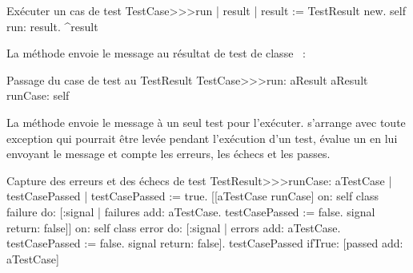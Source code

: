 \documentclass[a4paper,10pt,twoside]{book}
\begin{document}
\begin{method}[tastecaserun]{Exécuter un cas de test}
TestCase>>>run
	| result |
	result := TestResult new.
	self run: result.
	^result
\end{method}


La méthode  envoie le message  au résultat de test de classe ~:

\begin{method}[testcaserun:]{Passage du case de test au TestResult}
TestCase>>>run: aResult
	aResult runCase: self
\end{method}
La méthode  envoie le message  à un seul test pour l'exécuter.
 s'arrange avec toute exception qui pourrait être levée pendant l'exécution d'un test, évalue un  en lui envoyant le message  et compte les erreurs, les échecs et les passes.
\begin{method}[testresultruncase]{Capture des erreurs et des échecs de test}
TestResult>>>runCase: aTestCase
	| testCasePassed |
	testCasePassed := true.
	[[aTestCase runCase] 
			on: self class failure
			do: 
				[:signal | 
				failures add: aTestCase.
				testCasePassed := false.
				signal return: false]]
					on: self class error
					do:
						[:signal |
						errors add: aTestCase.
						testCasePassed := false.
						signal return: false].
	testCasePassed ifTrue: [passed add: aTestCase]
\end{method}
\end{document}

